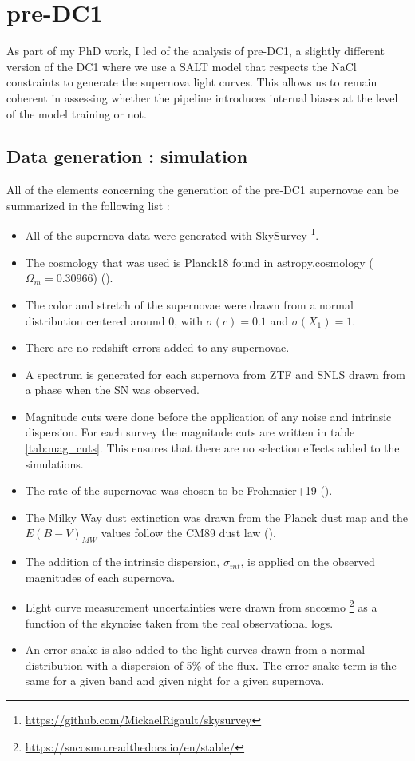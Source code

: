 \section{pre-DC1}

As part of my PhD work, I led of the analysis of pre-DC1, a slightly different version of the DC1 where we use a SALT model that respects the NaCl constraints to generate the supernova light curves. This allows us to remain coherent in assessing whether the pipeline introduces internal biases at the level of the model training or not. 

\subsection{Data generation : simulation}

All of the elements concerning the generation of the pre-DC1 supernovae can be summarized in the following list : 
\begin{itemize}
    \item All of the supernova data were generated with SkySurvey \footnote{\url{https://github.com/MickaelRigault/skysurvey}}.
    \item The cosmology that was used is Planck18 found in astropy.cosmology ($\Omega_m=0.30966$) (\cite{Planck_2018_params}).
    \item The color and stretch of the supernovae were drawn from a normal distribution centered around 0, with $\sigma(c) = 0.1$ and $\sigma(X_1) = 1$.
    \item There are no redshift errors added to any supernovae.
    \item A spectrum is generated for each supernova from ZTF and SNLS drawn from a phase when the SN was observed.
    \item Magnitude cuts were done before the application of any noise and intrinsic dispersion. For each survey the magnitude cuts are written in table \ref{tab:mag_cuts}. This ensures that there are no selection effects added to the simulations.
    \item The rate of the supernovae was chosen to be Frohmaier+19 (\cite{Frohmaier_2019}).
    \item The Milky Way dust extinction was drawn from the Planck dust map and the $E(B-V)_{MW}$ values follow the CM89 dust law (\cite{Cardelli_1989}).
    \item The addition of the intrinsic dispersion, $\sigma_{int}$, is applied on the observed magnitudes of each supernova.
    \item Light curve measurement uncertainties were drawn from sncosmo \footnote{\url{https://sncosmo.readthedocs.io/en/stable/}} as a function of the skynoise taken from the real observational logs.
    \item An error snake is also added to the light curves drawn from a normal distribution with a dispersion of 5\% of the flux. The error snake term is the same for a given band and given night for a given supernova.
\end{itemize}

